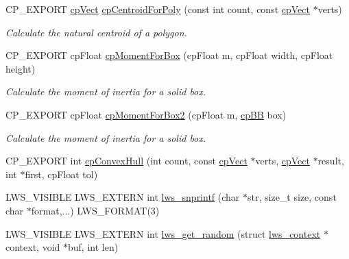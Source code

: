 \begin{DoxyCompactItemize}
\item 
\mbox{\label{group__misc_gaedd18beae9cbd2b6847747cc1d933bfd}} 
C\+P\+\_\+\+E\+X\+P\+O\+RT \hyperlink{structcpVect}{cp\+Vect} \hyperlink{group__misc_gaedd18beae9cbd2b6847747cc1d933bfd}{cp\+Centroid\+For\+Poly} (const int count, const \hyperlink{structcpVect}{cp\+Vect} $\ast$verts)
\begin{DoxyCompactList}\small\item\em Calculate the natural centroid of a polygon. \end{DoxyCompactList}\item 
\mbox{\label{group__misc_ga840facfe3f57151e1a8634b6047a45ef}} 
C\+P\+\_\+\+E\+X\+P\+O\+RT cp\+Float \hyperlink{group__misc_ga840facfe3f57151e1a8634b6047a45ef}{cp\+Moment\+For\+Box} (cp\+Float m, cp\+Float width, cp\+Float height)
\begin{DoxyCompactList}\small\item\em Calculate the moment of inertia for a solid box. \end{DoxyCompactList}\item 
\mbox{\label{group__misc_ga4a01a4b99c3976c1a9b4df14efe04552}} 
C\+P\+\_\+\+E\+X\+P\+O\+RT cp\+Float \hyperlink{group__misc_ga4a01a4b99c3976c1a9b4df14efe04552}{cp\+Moment\+For\+Box2} (cp\+Float m, \hyperlink{structcpBB}{cp\+BB} box)
\begin{DoxyCompactList}\small\item\em Calculate the moment of inertia for a solid box. \end{DoxyCompactList}\item 
C\+P\+\_\+\+E\+X\+P\+O\+RT int \hyperlink{group__misc_ga94ed1fc4d2c987c3e4df3cb16b12a156}{cp\+Convex\+Hull} (int count, const \hyperlink{structcpVect}{cp\+Vect} $\ast$verts, \hyperlink{structcpVect}{cp\+Vect} $\ast$result, int $\ast$first, cp\+Float tol)
\item 
L\+W\+S\+\_\+\+V\+I\+S\+I\+B\+LE L\+W\+S\+\_\+\+E\+X\+T\+E\+RN int \hyperlink{group__misc_ga2163492f17db959a36967adb73d823b4}{lws\+\_\+snprintf} (char $\ast$str, size\+\_\+t size, const char $\ast$format,...) L\+W\+S\+\_\+\+F\+O\+R\+M\+AT(3)
\item 
L\+W\+S\+\_\+\+V\+I\+S\+I\+B\+LE L\+W\+S\+\_\+\+E\+X\+T\+E\+RN int \hyperlink{group__misc_ga58f906c6be0ca80efd813f694569dd4a}{lws\+\_\+get\+\_\+random} (struct \hyperlink{structlws__context}{lws\+\_\+context} $\ast$context, void $\ast$buf, int len)

\end{DoxyCompactItemize}
